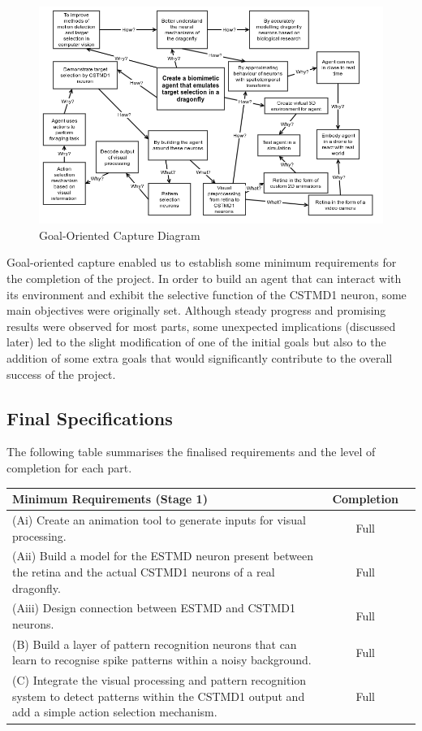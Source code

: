 \documentclass[a4paper,11pt]{article}
\begin{document}
	
	\begin{figure}
	\begin{center}
	\includegraphics[scale = 0.5]{goalorient}
	\end{center}
	\caption{Goal-Oriented Capture Diagram}
	\end{figure}	
	


	
	Goal-oriented capture enabled us to establish some minimum requirements for the completion of the project. In order to build an agent that can interact with its environment and exhibit the selective function of the CSTMD1 neuron, some main objectives were originally set. Although steady progress and promising results were observed for most parts, some unexpected implications (discussed later) led to the slight modification of one of the initial goals but also to the addition of some extra goals that would significantly contribute to the overall success of the project.
	
\subsection{Final Specifications}
The following table summarises the finalised requirements and the level of completion for each part.
\begin{center}
    \begin{tabular}{p{12cm} c c}
    \textbf{Minimum Requirements (Stage 1)} & \textbf{Completion} \\ \hline
    (Ai) Create an animation tool to generate inputs for visual processing. & Full \\ 
	(Aii) Build a model for the ESTMD neuron present between the retina and the actual CSTMD1 neurons of a real dragonfly. & Full \\
	(Aiii) Design connection between ESTMD and CSTMD1 neurons. & Full \\
	(B) Build a layer of pattern recognition neurons that can learn to recognise spike patterns within a noisy background. & Full\\
	(C) Integrate the visual processing and pattern recognition system to detect patterns within the CSTMD1 output and add a simple action selection mechanism. & Full\\
    \end{tabular}
\end{center}
\end{document}

